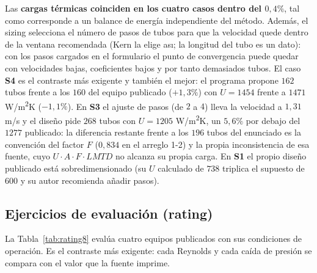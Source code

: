 \documentclass[11pt,a4paper]{article}
\begin{document}
Las \textbf{cargas t\'ermicas coinciden en los cuatro casos dentro del $0{,}4\%$}, tal como corresponde a un balance de energ\'ia independiente del m\'etodo. Adem\'as, el sizing selecciona el n\'umero de pasos de tubos para que la velocidad quede dentro de la ventana recomendada (Kern la elige as\i; la longitud del tubo es un dato): con los pasos cargados en el formulario el punto de convergencia puede quedar con velocidades bajas, coeficientes bajos y por tanto demasiados tubos. El caso \textbf{S4} es el contraste m\'as exigente y tambi\'en el mejor: el programa propone $162$ tubos frente a los $160$ del equipo publicado ($+1{,}3\%$) con $U = 1454$ frente a $1471$ W/m\textsuperscript{2}K ($-1{,}1\%$). En \textbf{S3} el ajuste de pasos (de $2$ a $4$) lleva la velocidad a $1{,}31$ m/s y el dise\~no pide $268$ tubos con $U = 1205$ W/m\textsuperscript{2}K, un $5{,}6\%$ por debajo del $1277$ publicado: la diferencia restante frente a los $196$ tubos del enunciado es la convenci\'on del factor $F$ ($0{,}834$ en el arreglo 1-2) y la propia inconsistencia de esa fuente, cuyo $U\cdot A\cdot F\cdot LMTD$ no alcanza su propia carga. En \textbf{S1} el propio dise\~no publicado est\'a sobredimensionado (su $U$ calculado de $738$ triplica el supuesto de $600$ y su autor recomienda a\~nadir pasos).

\subsection{Ejercicios de evaluaci\'on (rating)}

La Tabla~\ref{tab:rating8} eval\'ua cuatro equipos publicados con sus
condiciones de operaci\'on. Es el contraste m\'as exigente: cada
Reynolds y cada ca\'ida de presi\'on se compara con el valor que la
fuente imprime.
\end{document}

